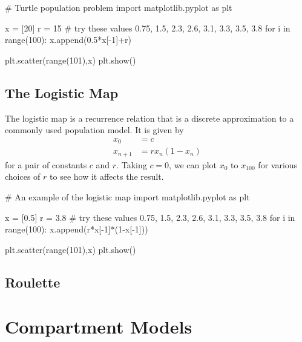\documentclass{ximera}
\begin{document}
\begin{sageCell}
# Turtle population problem
import matplotlib.pyplot as plt

x = [20]
r = 15 # try these values 0.75, 1.5, 2.3, 2.6, 3.1, 3.3, 3.5, 3.8
for i in range(100):
    x.append(0.5*x[-1]+r)
             
plt.scatter(range(101),x)
plt.show()
\end{sageCell}

\subsection{The Logistic Map}

The logistic map is a recurrence relation that is a discrete 
approximation to a commonly used population model. It is given by
\begin{align*}
	x_0 &= c\\
	x_{n+1} &= rx_n(1-x_n)
\end{align*}
for a pair of constants $c$ and $r$. Taking $c=0$, we can plot 
$x_0$ to $x_{100}$ for various choices of $r$ to see how it affects
the result. 

\begin{sageCell}
# An example of the logistic map
import matplotlib.pyplot as plt

x = [0.5]
r = 3.8 # try these values 0.75, 1.5, 2.3, 2.6, 3.1, 3.3, 3.5, 3.8
for i in range(100):
    x.append(r*x[-1]*(1-x[-1]))
             
plt.scatter(range(101),x)
plt.show()
\end{sageCell}

\subsection{Roulette}



\section{Compartment Models}
\end{document}
